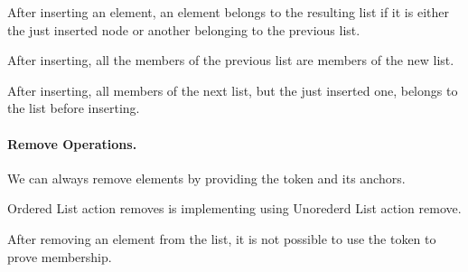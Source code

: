 \begin{theorem}
  \label{thm:MOList.Properties.insert_new_iff}
  \leanok
  After inserting an element, an element belongs to the resulting list if it is
either the just inserted node or another belonging to the previous list.
  \end{theorem}

\begin{theorem}
  \label{thm:MOList.Properties.insert_diff_same_old}
  \leanok
  After inserting, all the members of the previous list are members of the new list.
  \end{theorem}

\begin{theorem}
  \label{thm:MOList.Properties.insert_diff_same_old}
  \leanok
  After inserting, all members of the next list, but the just inserted one,
belongs to the list before inserting.
  \end{theorem}

\paragraph*{Remove Operations.}

\begin{theorem}
  \label{thm:MOList.Properties.EnabledRemove'}
  \leanok
  We can always remove elements by providing the token and its anchors.
  \end{theorem}

\begin{theorem}
  \label{thm:MOList.Properties.OrdRemove_UordRemove}
  \leanok
  Ordered List action removes is implementing using Unorederd List action
remove.
  \end{theorem}

\begin{theorem}
  \label{thm:MOList.Properties.AfterRemove_TId_not_member}
  \leanok
  After removing an element from the list, it is not possible to use the token
to prove membership.
  \end{theorem}
  
